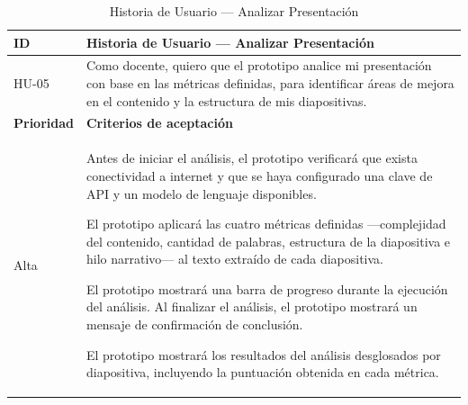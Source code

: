 \documentclass[11pt]{article}
\newcommand{\ttstyle}{%
  \small
  \setlength{\tabcolsep}{6pt}%
  \renewcommand{\arraystretch}{1.25}%
  \arrayrulecolor{azulprofundo}%
}
\newcommand{\hairrule}{%
  \arrayrulecolor{azulregla}\midrule[0.3pt]\arrayrulecolor{azulprofundo}%
}
\begin{document}
\begin{table}[H]
    \centering
    \renewcommand{\arraystretch}{1.2}
    \ttstyle
    \begin{tabular}{p{2.5cm}p{11cm}}
        \toprule
        \textbf{ID} & \textbf{Historia de Usuario — Analizar Presentación} \\
        \midrule
        HU-05 & Como docente, quiero que el prototipo analice mi presentación con base en las métricas definidas, para identificar áreas de mejora en el contenido y la estructura de mis diapositivas. \\
        \hairrule
        \textbf{Prioridad} & \textbf{Criterios de aceptación} \\
        \hairrule
        Alta & Antes de iniciar el análisis, el prototipo verificará que exista conectividad a internet y que se haya configurado una clave de API y un modelo de lenguaje disponibles.
        
        El prototipo aplicará las cuatro métricas definidas —complejidad del contenido, cantidad de palabras, estructura de la diapositiva e hilo narrativo— al texto extraído de cada diapositiva. 
        
        El prototipo mostrará una barra de progreso durante la ejecución del análisis. Al finalizar el análisis, el prototipo mostrará un mensaje de confirmación de conclusión. 
        
        El prototipo mostrará los resultados del análisis desglosados por diapositiva, incluyendo la puntuación obtenida en cada métrica. \\
        \bottomrule
    \end{tabular}
    \caption{Historia de Usuario — Analizar Presentación}
    \label{tab:hu-analizar-presentacion}
\end{table}
\end{document}
